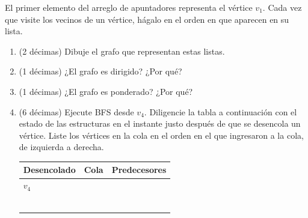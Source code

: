 {\begin{center}
\end{center}

El primer elemento del arreglo de apuntadores representa el vértice \(v_1\). Cada vez que visite los vecinos de un vértice, hágalo en el orden en que aparecen en su lista.
}

\begin{enumerate}
  \item (2 décimas) Dibuje el grafo que representan estas listas.
  \item (1 décimas) ¿El grafo es dirigido? ¿Por qué?
  \item (1 décimas) ¿El grafo es ponderado? ¿Por qué?
  \item (6 décimas) Ejecute BFS desde \(v_4\). Diligencie la tabla a continuación con el estado de las estructuras en el instante justo después de que se desencola un vértice. Liste los vértices en la cola en el orden en el que ingresaron a la cola, de izquierda a derecha.

\begin{center}
\begin{tabularx}{\textwidth}{|>{\centering\arraybackslash}X|>{\centering\arraybackslash}X|>{\centering\arraybackslash}X|}
\hline
\textbf{Desencolado} & \textbf{Cola} & \textbf{Predecesores} \\
\hline
$v_4$ \rule{0pt}{0.9cm} & & \\
\hline
\rule{0pt}{0.9cm} & & \\
\hline
\rule{0pt}{0.9cm} & & \\
\hline
\rule{0pt}{0.9cm} & & \\
\hline
\rule{0pt}{0.9cm} & & \\
\hline
\rule{0pt}{0.9cm} & & \\
\hline
\rule{0pt}{0.9cm} & & \\
\hline
\end{tabularx}
\end{center}
\end{enumerate}

\bigskip
